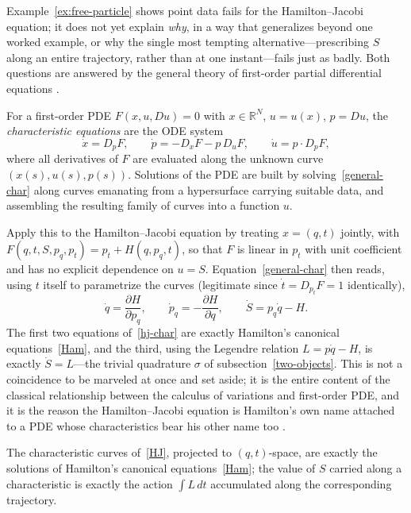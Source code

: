 Example~\ref{ex:free-particle} shows point data fails for the Hamilton--Jacobi
equation; it does not yet explain \emph{why}, in a way that generalizes beyond
one worked example, or why the single most tempting alternative---prescribing
$S$ along an entire trajectory, rather than at one instant---fails just as
badly. Both questions are answered by the general theory of first-order partial
differential equations \cite{evans2010,courant-hilbert1962}.

For a first-order PDE $F(x,u,Du)=0$ with $x\in\mathbb{R}^N$, $u=u(x)$, $p=Du$,
the \emph{characteristic equations} are the ODE system
\begin{equation}
\label{general-char}
\dot x = D_pF, \qquad \dot p = -D_xF - p\,D_uF, \qquad \dot u = p\cdot D_pF ,
\end{equation}
where all derivatives of $F$ are evaluated along the unknown curve
$(x(s),u(s),p(s))$. Solutions of the PDE are built by
solving~\eqref{general-char} along curves emanating from a hypersurface
carrying suitable data, and assembling the resulting family of curves into a
function $u$.

Apply this to the Hamilton--Jacobi equation by treating $x=(q,t)$ jointly, with
$F(q,t,S,p_q,p_t) = p_t + H(q,p_q,t)$, so that $F$ is linear in $p_t$ with unit
coefficient and has no explicit dependence on $u=S$.
Equation~\eqref{general-char} then reads, using $t$ itself to parametrize the
curves (legitimate since $\dot t = D_{p_t}F=1$ identically),
\begin{equation}
\label{hj-char}
\dot q = \frac{\partial H}{\partial p_q}, \qquad \dot p_q = -\frac{\partial H}{\partial q}, \qquad \dot S = p_q\dot q - H .
\end{equation}
The first two equations of~\eqref{hj-char} are exactly Hamilton's canonical
equations~\eqref{Ham}, and the third, using the Legendre relation $L=p\dot q -
H$, is exactly $\dot S = L$---the trivial quadrature $\sigma$ of
subsection~\ref{two-objects}. This is not a coincidence to be marveled at once
and set aside; it is the entire content of the classical relationship between
the calculus of variations and first-order PDE, and it is the reason the
Hamilton--Jacobi equation is Hamilton's own name attached to a PDE whose
characteristics bear his other name too \cite{evans2010}.

\begin{proposition}
\label{prop:characteristics}
The characteristic curves of~\eqref{HJ}, projected to $(q,t)$-space, are
    exactly the solutions of Hamilton's canonical equations~\eqref{Ham}; the
    value of $S$ carried along a characteristic is exactly the action $\int
    L\,dt$ accumulated along the corresponding trajectory.
\end{proposition}

